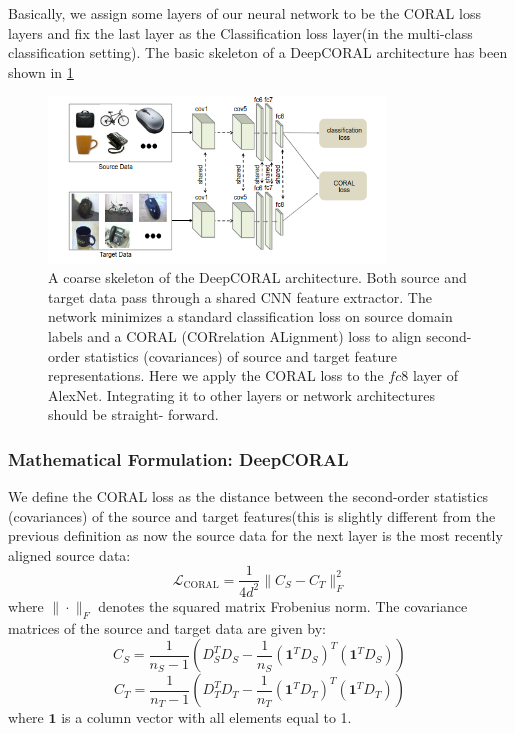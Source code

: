 \documentclass{article}
\begin{document}
Basically, we assign some layers of our neural network to be the CORAL loss layers and fix the last layer as the Classification loss layer(in the multi-class classification setting). The basic skeleton of a DeepCORAL architecture has been shown in \ref{fig:deepcrl}

\begin{figure}[h]
  \centering
  \includegraphics[width=0.8\textwidth]{images/DeepCORAL/DeepCORAL.png}
 \caption{A coarse skeleton of the DeepCORAL architecture. Both source and target data pass through a shared CNN feature extractor. The network minimizes a standard classification loss on source domain labels and a CORAL (CORrelation ALignment) loss to align second-order statistics (covariances) of source and target feature representations. Here we apply the CORAL loss to the $fc$8 layer of
AlexNet. Integrating it to other layers or network architectures should be straight-
forward. }
  \label{fig:deepcrl}
\end{figure}

\subsubsection{Mathematical Formulation: DeepCORAL}
We define the CORAL loss as the distance between the second-order statistics (covariances) of the source and target features(this is slightly different from the previous definition as now the source data for the next layer is the most recently aligned source data:
\[
\mathcal{L}_{\text{CORAL}} = \frac{1}{4d^2} \| C_S - C_T \|_F^2 \tag{1}
\]
where $\| \cdot \|_F$ denotes the squared matrix Frobenius norm. The covariance matrices of the source and target data are given by:
\[
C_S = \frac{1}{n_S - 1} \left( D_S^T D_S - \frac{1}{n_S} \left( \mathbf{1}^T D_S \right)^T \left( \mathbf{1}^T D_S \right) \right) \tag{2}
\]
\[
C_T = \frac{1}{n_T - 1} \left( D_T^T D_T - \frac{1}{n_T} \left( \mathbf{1}^T D_T \right)^T \left( \mathbf{1}^T D_T \right) \right) \tag{3}
\]
where $\mathbf{1}$ is a column vector with all elements equal to 1.
\end{document}
